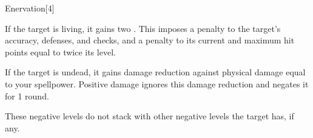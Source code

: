\begin{spellsection}{Enervation}[4]
    \begin{spellheader}
    \end{spellheader}
    \begin{spellcontent}
        \begin{spelltargetinginfo}
        \end{spelltargetinginfo}
        \begin{spelleffects}
            \spelleffect If the target is living, it gains two . This imposes a  penalty to the target's accuracy, defenses, and checks, and a penalty to its current and maximum hit points equal to twice its level.

            If the target is undead, it gains damage reduction against physical damage equal to your spellpower. Positive damage ignores this damage reduction and negates it for 1 round.
        \end{spelleffects}
    \end{spellcontent}
    \begin{spellfooter}
        \spellnotes These negative levels do not stack with other negative levels the target has, if any.
        \miscastrandom
    \end{spellfooter}
\end{spellsection}

